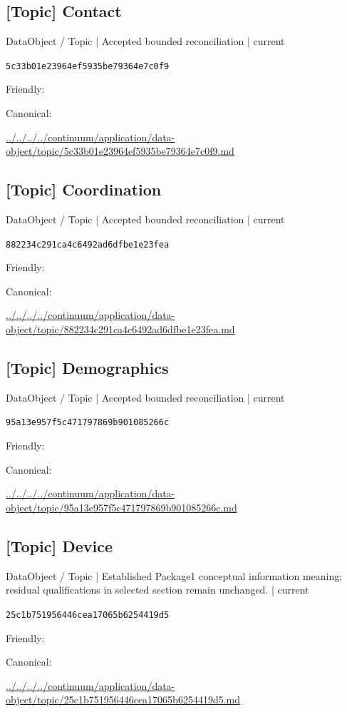 \documentclass[10pt,a4paper]{article}
\begin{document}
\subsection*{[Topic] Contact}
{\small DataObject / Topic | Accepted bounded reconciliation | current}\par
\texttt{5c33b01e23964ef5935be79364e7c0f9}\par
Friendly: \par
Canonical: \par
{\footnotesize\url{../../../../continuum/application/data-object/topic/5c33b01e23964ef5935be79364e7c0f9.md}}\par
\subsection*{[Topic] Coordination}
{\small DataObject / Topic | Accepted bounded reconciliation | current}\par
\texttt{882234c291ca4c6492ad6dfbe1e23fea}\par
Friendly: \par
Canonical: \par
{\footnotesize\url{../../../../continuum/application/data-object/topic/882234c291ca4c6492ad6dfbe1e23fea.md}}\par
\subsection*{[Topic] Demographics}
{\small DataObject / Topic | Accepted bounded reconciliation | current}\par
\texttt{95a13e957f5c471797869b901085266c}\par
Friendly: \par
Canonical: \par
{\footnotesize\url{../../../../continuum/application/data-object/topic/95a13e957f5c471797869b901085266c.md}}\par
\subsection*{[Topic] Device}
{\small DataObject / Topic | Established Package1 conceptual information meaning; residual qualifications in selected section remain unchanged. | current}\par
\texttt{25c1b751956446cea17065b6254419d5}\par
Friendly: \par
Canonical: \par
{\footnotesize\url{../../../../continuum/application/data-object/topic/25c1b751956446cea17065b6254419d5.md}}\par
\end{document}
